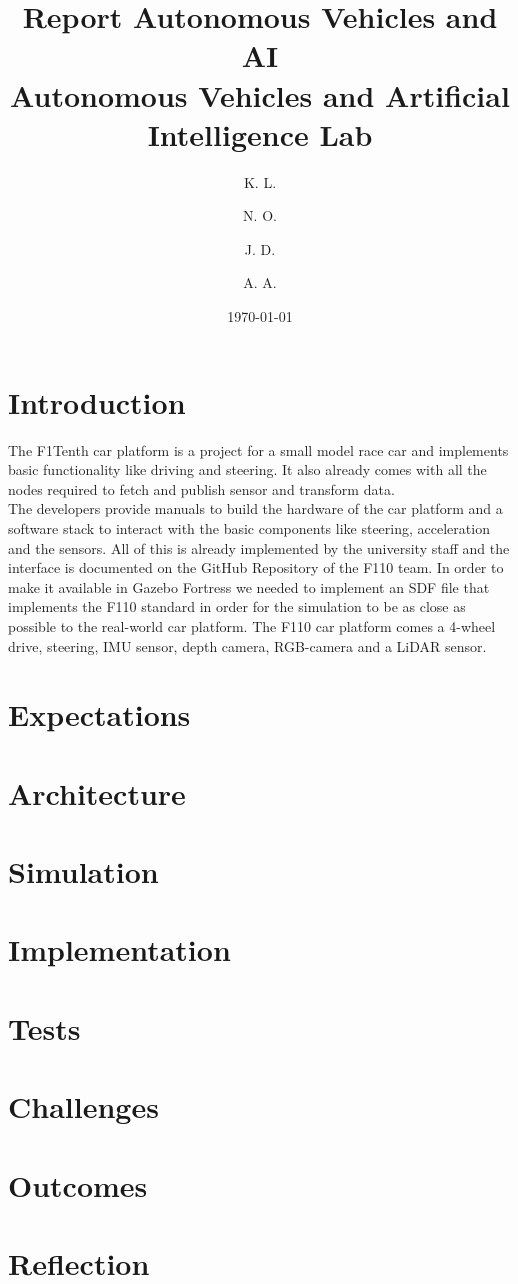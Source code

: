 \documentclass[a4paper,11pt]{article}
\title{Report Autonomous Vehicles and AI\\[1ex]
%
\large Autonomous Vehicles and Artificial Intelligence Lab}
\author{
    K. L. \\
    \and
    N. O. \\
    \and
    J. D. \\
    \and
    A. A.
}
\date{\today}
\begin{document}
\maketitle

\section{Introduction}

The F1Tenth car platform is a project for a small model race car and implements basic functionality like driving and steering. 
It also already comes with all the nodes required to fetch and publish sensor and transform data.\\
\newline
The developers provide manuals to build the hardware of the car platform and a software stack to interact with the basic components like steering, acceleration and the sensors. All of this is already implemented by the university staff and the interface is documented on the GitHub Repository of the F110 team.
In order to make it available in Gazebo Fortress we needed to implement an SDF file that implements the F110 standard in order for the simulation to be as close as possible to the real-world car platform.
The F110 car platform comes a 4-wheel drive, steering, IMU sensor, depth camera, RGB-camera and a LiDAR sensor.

\section{Expectations}


\section{Architecture}


\section{Simulation}


\section{Implementation}


\section{Tests}


\section{Challenges}


\section{Outcomes}


\section{Reflection}


\newpage



\end{document}
